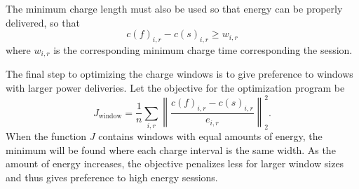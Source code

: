 The minimum charge length must also be used so that energy can be properly delivered, so that
\begin{equation*}
	c(f)_{i,r} - c(s)_{i,r} \ge w_{i,r}
\end{equation*}
where $w_{i,r}$ is the corresponding minimum charge time corresponding the session.
\par The final step to optimizing the charge windows is to give preference to windows with larger power deliveries. Let the objective for the optimization program be 
\begin{equation}
	J_{\text{window}} = \frac{1}{n}\sum_{i,r} \left \lVert \frac{c(f)_{i,r} - c(s)_{i,r}}{e_{i,r}} \right \rVert^2_2.
\end{equation}
When the function $J$ contains windows with equal amounts of energy, the minimum will be found where each charge interval is the same width. As the amount of energy increases, the objective penalizes less for larger window sizes and thus gives preference to high energy sessions.
